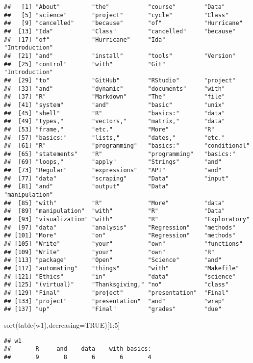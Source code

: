 \documentclass[
]{article}
\newenvironment{Shaded}{\begin{snugshade}}{\end{snugshade}}
\newcommand{\AttributeTok}[1]{\textcolor[rgb]{0.77,0.63,0.00}{#1}}
\newcommand{\ConstantTok}[1]{\textcolor[rgb]{0.00,0.00,0.00}{#1}}
\newcommand{\DecValTok}[1]{\textcolor[rgb]{0.00,0.00,0.81}{#1}}
\newcommand{\FunctionTok}[1]{\textcolor[rgb]{0.00,0.00,0.00}{#1}}
\newcommand{\NormalTok}[1]{#1}
\newcommand{\SpecialCharTok}[1]{\textcolor[rgb]{0.00,0.00,0.00}{#1}}
\begin{document}
\begin{verbatim}
##   [1] "About"         "the"           "course"        "Data"         
##   [5] "science"       "project"       "cycle"         "Class"        
##   [9] "cancelled"     "because"       "of"            "Hurricane"    
##  [13] "Ida"           "Class"         "cancelled"     "because"      
##  [17] "of"            "Hurricane"     "Ida"           "Introduction" 
##  [21] "and"           "install"       "tools"         "Version"      
##  [25] "control"       "with"          "Git"           "Introduction" 
##  [29] "to"            "GitHub"        "RStudio"       "project"      
##  [33] "and"           "dynamic"       "documents"     "with"         
##  [37] "R"             "Markdown"      "The"           "file"         
##  [41] "system"        "and"           "basic"         "unix"         
##  [45] "shell"         "R"             "basics:"       "data"         
##  [49] "types,"        "vectors,"      "matrix,"       "data"         
##  [53] "frame,"        "etc."          "More"          "R"            
##  [57] "basics:"       "lists,"        "dates,"        "etc."         
##  [61] "R"             "programming"   "basics:"       "conditional"  
##  [65] "statements"    "R"             "programming"   "basics:"      
##  [69] "loops,"        "apply"         "Strings"       "and"          
##  [73] "Regular"       "expressions"   "API"           "and"          
##  [77] "data"          "scraping"      "Data"          "input"        
##  [81] "and"           "output"        "Data"          "manipulation" 
##  [85] "with"          "R"             "More"          "data"         
##  [89] "manipulation"  "with"          "R"             "Data"         
##  [93] "visualization" "with"          "R"             "Exploratory"  
##  [97] "data"          "analysis"      "Regression"    "methods"      
## [101] "More"          "on"            "Regression"    "methods"      
## [105] "Write"         "your"          "own"           "functions"    
## [109] "Write"         "your"          "own"           "R"            
## [113] "package"       "Open"          "Science"       "and"          
## [117] "automating"    "things"        "with"          "Makefile"     
## [121] "Ethics"        "in"            "data"          "science"      
## [125] "(virtual)"     "Thanksgiving," "no"            "class"        
## [129] "Final"         "project"       "presentation"  "Final"        
## [133] "project"       "presentation"  "and"           "wrap"         
## [137] "up"            "Final"         "grades"        "due"
\end{verbatim}

\begin{Shaded}
\begin{Highlighting}[]
\FunctionTok{sort}\NormalTok{(}\FunctionTok{table}\NormalTok{(w1),}\AttributeTok{decreasing=}\ConstantTok{TRUE}\NormalTok{)[}\DecValTok{1}\SpecialCharTok{:}\DecValTok{5}\NormalTok{]}
\end{Highlighting}
\end{Shaded}

\begin{verbatim}
## w1
##       R     and    data    with basics: 
##       9       8       6       6       4
\end{verbatim}
\end{document}
